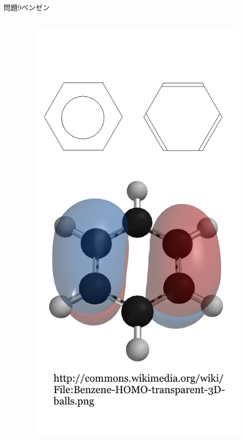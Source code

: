 \documentclass[dvipdfmx]{beamer}
\begin{document}
\begin{frame}{問題9}{ベンゼン}
\begin{columns}[t]
\begin{column}{0.7\textwidth}
\end{column}
\begin{column}{0.3\textwidth}
\begin{figure}[htbp]
    \centering
    \includegraphics[bb=0mm 0mm 100.0mm 170.0mm, scale=0.35, type=pdf]{img/problem9.pdf}
\end{figure}
\end{column}
\end{columns}
\end{frame}
\end{document}
